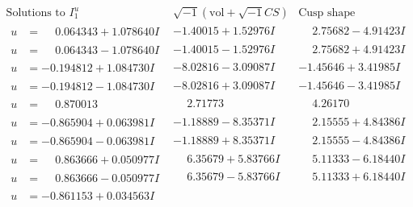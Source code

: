 \documentclass[1p]{elsarticle_modified}
\theoremstyle{definition}
\newcommand{\I}{\sqrt{-1}}
\begin{document}
$$\begin{array}{c|c|c}  
\text{Solutions to }I^u_{1}& \I (\text{vol} + \sqrt{-1}CS) & \text{Cusp shape}\\
 \hline 
\begin{aligned}
u &= \phantom{-}0.064343 + 1.078640 I\end{aligned}
 & -1.40015 + 1.52976 I & \phantom{-}2.75682 - 4.91423 I \\ \hline\begin{aligned}
u &= \phantom{-}0.064343 - 1.078640 I\end{aligned}
 & -1.40015 - 1.52976 I & \phantom{-}2.75682 + 4.91423 I \\ \hline\begin{aligned}
u &= -0.194812 + 1.084730 I\end{aligned}
 & -8.02816 - 3.09087 I & -1.45646 + 3.41985 I \\ \hline\begin{aligned}
u &= -0.194812 - 1.084730 I\end{aligned}
 & -8.02816 + 3.09087 I & -1.45646 - 3.41985 I \\ \hline\begin{aligned}
u &= \phantom{-}0.870013\phantom{ +0.000000I}\end{aligned}
 & \phantom{-}2.71773\phantom{ +0.000000I} & \phantom{-}4.26170\phantom{ +0.000000I} \\ \hline\begin{aligned}
u &= -0.865904 + 0.063981 I\end{aligned}
 & -1.18889 - 8.35371 I & \phantom{-}2.15555 + 4.84386 I \\ \hline\begin{aligned}
u &= -0.865904 - 0.063981 I\end{aligned}
 & -1.18889 + 8.35371 I & \phantom{-}2.15555 - 4.84386 I \\ \hline\begin{aligned}
u &= \phantom{-}0.863666 + 0.050977 I\end{aligned}
 & \phantom{-}6.35679 + 5.83766 I & \phantom{-}5.11333 - 6.18440 I \\ \hline\begin{aligned}
u &= \phantom{-}0.863666 - 0.050977 I\end{aligned}
 & \phantom{-}6.35679 - 5.83766 I & \phantom{-}5.11333 + 6.18440 I \\ \hline\begin{aligned}
u &= -0.861153 + 0.034563 I\end{aligned}

\end{array}$$
\end{document}
